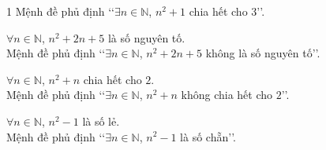 \begin{bt}
{\begin{enumEX}{1}
			Mệnh đề phủ định \lq\lq $\exists n\in \mathbb{N}$,  $n^2+1$ chia hết cho $3$\rq\rq.
			\item $\forall n\in \mathbb{N}$, $n^2+2n+5$ là  số nguyên tố.\\
			Mệnh đề phủ định \lq\lq $\exists  n\in \mathbb{N}$, $n^2+2n+5$ không là số nguyên tố\rq\rq.
			\item $\forall n\in \mathbb{N}$, $n^2+n$ chia hết cho  $2$.\\
			Mệnh đề phủ định  \lq\lq $\exists n\in \mathbb{N}$, $n^2+n$ không chia hết cho $2$\rq\rq.
			\item $\forall n\in \mathbb{N}$,  $n^2-1$ là số lẻ.\\
			Mệnh đề phủ định \lq\lq $\exists n\in \mathbb{N}$, $n^2-1$ là  số chẵn\rq\rq.
		\end{enumEX}
	 }
\end{bt}

